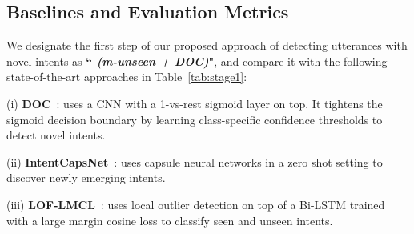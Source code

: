 

\subsection{Baselines and Evaluation Metrics} 



We designate the first step of our proposed approach of detecting utterances with novel intents as \textbf{``\mname{} \textit{(m-unseen + DOC)}"}, and compare it with the following state-of-the-art approaches in Table~\ref{tab:stage1}: 

\smallskip
\noindent \noindent (i) \textbf{DOC}~\cite{shu2017doc}: uses a CNN with a 1-vs-rest sigmoid layer on top. It tightens the sigmoid decision boundary by learning class-specific confidence thresholds to detect novel intents. 

\noindent (ii) \textbf{IntentCapsNet}~\cite{xia2018}: uses capsule neural networks in a zero shot setting to discover newly emerging intents. 

\noindent (iii) \textbf{LOF-LMCL}~\cite{lin2019deep}: uses local outlier detection on top of a Bi-LSTM trained with a large margin cosine loss to classify seen and unseen intents.%

